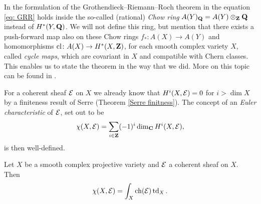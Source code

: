 \begin{remark}
    In the formulation of the Grothendieck--Riemann--Roch theorem in \cite[\S 15, Theorem 15.2]{Fulton1998} the equation \eqref{eq: GRR} holds inside the so-called (rational) \emph{Chow ring} $A(Y)_\mathbf Q = A(Y) \otimes_{\mathbf Z} \mathbf Q$ instead of $H^{*}(Y, \mathbf Q)$. We will not define this ring, but mention that there exists a push-forward map also on these Chow rings $f_* \colon A(X) \to A(Y)$ and homomorphisms $\operatorname{cl} \colon A(X) \to H^{*}(X, \mathbf Z)$, for each smooth complex variety $X$, called \emph{cycle maps}, which are covariant in $X$ and compatible with Chern classes. This enables us to state the theorem in the way that we did. More on this topic can be found in \cite[\S 19]{Fulton1998}.
\end{remark}

For a coherent sheaf $\mathcal E$ on $X$ we already know that $H^{i}(X, \mathcal E) = 0$ for $i > \dim X$ by a finiteness result of Serre (Theorem \ref{Serre finitness}). The concept of an \emph{Euler characteristic} of $\mathcal E$, set out to be
\[
    \chi(X, \mathcal E) = \sum_{i \in \mathbf Z} (-1)^i \dim_\mathbf C H^i(X, \mathcal E),
\] 
is then well-defined.

\begin{corollary}
    \label{Hirzebruch-Riemann-Roch}
    Let $X$ be a smooth complex projective variety and $\mathcal E$ a coherent sheaf on $X$. Then
    \begin{equation}
        \label{eq: Hirzebruch-Riemann-Roch formula}
        \chi(X, \E) = \int_X \ch{\E}\tdclass{X}.
    \end{equation}
\end{corollary}


